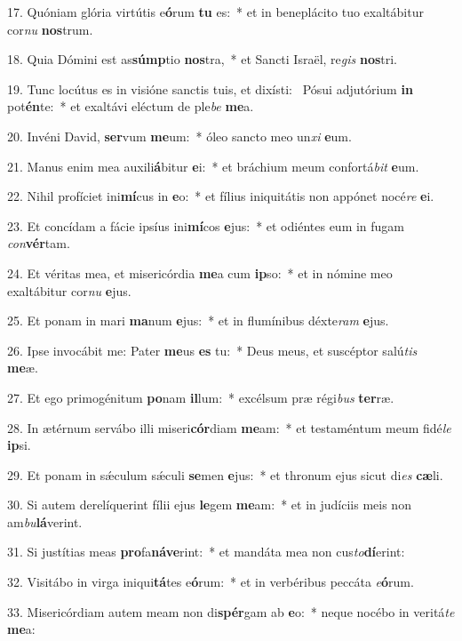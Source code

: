 17. Quóniam glória virtútis e\textbf{ó}rum \textbf{tu} es:~*  et in beneplácito tuo exaltábitur cor\textit{nu} \textbf{nos}trum.\

18. Quia Dómini est as\textbf{súmp}tio \textbf{nos}tra,~*  et Sancti Israël, re\textit{gis} \textbf{nos}tri.\

19. Tunc locútus es in visióne sanctis tuis, et dixísti: \dag\  Pósui adjutórium \textbf{in} pot\textbf{én}te:~*  et exaltávi eléctum de ple\textit{be} \textbf{me}a.\

20. Invéni David, \textbf{ser}vum \textbf{me}um:~*  óleo sancto meo un\textit{xi} \textbf{e}um.\

21. Manus enim mea auxili\textbf{á}bitur \textbf{e}i:~*  et bráchium meum confortá\textit{bit} \textbf{e}um.\

22. Nihil profíciet ini\textbf{mí}cus in \textbf{e}o:~*  et fílius iniquitátis non appónet nocé\textit{re} \textbf{e}i.\

23. Et concídam a fácie ipsíus ini\textbf{mí}cos \textbf{e}jus:~*  et odiéntes eum in fugam \textit{con}\textbf{vér}tam.\

24. Et véritas mea, et misericórdia \textbf{me}a cum \textbf{ip}so:~*  et in nómine meo exaltábitur cor\textit{nu} \textbf{e}jus.\

25. Et ponam in mari \textbf{ma}num \textbf{e}jus:~*  et in flumínibus déxte\textit{ram} \textbf{e}jus.\

26. Ipse invocábit me: Pater \textbf{me}us \textbf{es} tu:~*  Deus meus, et suscéptor salú\textit{tis} \textbf{me}æ.\

27. Et ego primogénitum \textbf{po}nam \textbf{il}lum:~*  excélsum præ régi\textit{bus} \textbf{ter}ræ.\

28. In ætérnum servábo illi miseri\textbf{cór}diam \textbf{me}am:~*  et testaméntum meum fidé\textit{le} \textbf{ip}si.\

29. Et ponam in sǽculum sǽculi \textbf{se}men \textbf{e}jus:~*  et thronum ejus sicut di\textit{es} \textbf{cæ}li.\

30. Si autem derelíquerint fílii ejus \textbf{le}gem \textbf{me}am:~*  et in judíciis meis non am\textit{bu}\textbf{lá}verint.\

31. Si justítias meas \textbf{pro}fa\textbf{ná}\textbf{ve}rint:~*  et mandáta mea non cus\textit{to}\textbf{dí}erint:\

32. Visitábo in virga iniqui\textbf{tá}tes e\textbf{ó}rum:~*  et in verbéribus peccáta \textit{e}\textbf{ó}rum.\

33. Misericórdiam autem meam non di\textbf{spér}gam ab \textbf{e}o:~*  neque nocébo in veritá\textit{te} \textbf{me}a:\

